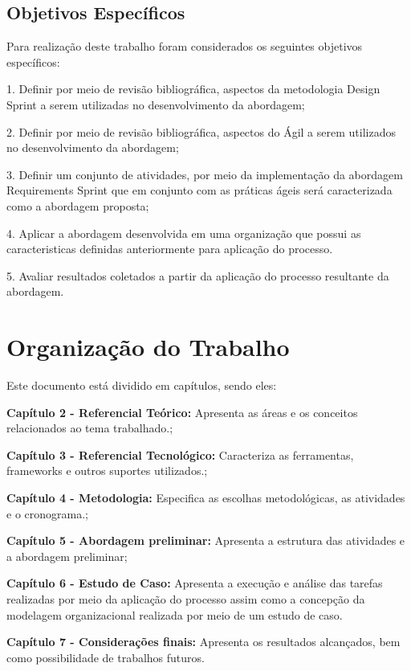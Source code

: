 \subsection{Objetivos Específicos}
Para realização deste trabalho foram considerados 
os seguintes objetivos específicos:

1. Definir por meio de revisão bibliográfica, aspectos da metodologia Design Sprint a serem utilizadas no desenvolvimento da abordagem;


2. Definir por meio de revisão bibliográfica, aspectos do Ágil a serem utilizados no
desenvolvimento da abordagem;

3. Definir um conjunto de atividades, por meio da implementação da abordagem Requirements Sprint que em conjunto com as práticas ágeis será caracterizada como a abordagem proposta;

4. Aplicar a abordagem desenvolvida em uma organização que possui as caracteristicas definidas anteriormente para aplicação do processo.

5. Avaliar resultados coletados a partir da aplicação do processo resultante da abordagem.

\newpage
\section{Organização do Trabalho}
Este documento está dividido em capítulos, sendo eles:

\textbf{Capítulo 2 - Referencial Teórico:}
 Apresenta as áreas e os conceitos relacionados ao 
 tema trabalhado.;

\textbf{Capítulo 3 - Referencial Tecnológico: }
Caracteriza as
ferramentas, frameworks e outros suportes utilizados.;

\textbf{Capítulo 4 - Metodologia: }
Especifica as escolhas
metodológicas, as atividades e o cronograma.;

\textbf{Capítulo 5 - Abordagem preliminar: }
Apresenta
a estrutura das atividades e a abordagem preliminar; 

\textbf{Capítulo 6 - Estudo de Caso: }
Apresenta a execução e análise das tarefas realizadas por meio da aplicação do processo assim 
como a concepção da
modelagem organizacional realizada por meio 
de um estudo de caso.

\textbf{Capítulo 7 - Considerações finais: }
Apresenta
os resultados alcançados, bem como possibilidade de trabalhos futuros.


